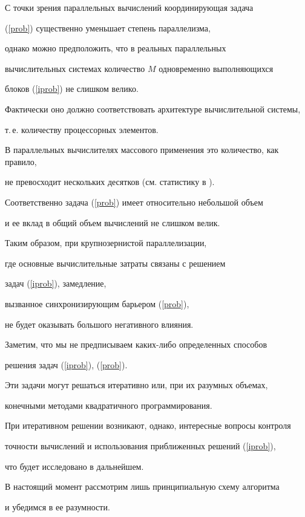С точки зрения параллельных вычислений координирующая задача


(\ref{prob}) существенно уменьшает степень параллелизма,


однако можно предположить, что в реальных параллельных


вычислительных системах количество $M$ одновременно выполняющихся


блоков (\ref{iprob}) не слишком велико.





Фактически оно должно соответствовать архитектуре вычислительной системы,


т.\,е. количеству процессорных элементов.


В параллельных вычислителях массового применения это количество, как правило,


не превосходит нескольких десятков (см. статистику в \cite{par}).


Соответственно  задача (\ref{prob}) имеет относительно небольшой объем


и ее вклад в общий объем вычислений не слишком велик.


Таким образом, при крупнозернистой параллелизации,


где основные вычислительные затраты связаны с решением


задач (\ref{iprob}), замедление,


вызванное синхронизирующим барьером (\ref{prob}),


не будет оказывать большого негативного влияния.





Заметим, что мы не предписываем каких-либо определенных способов


решения задач (\ref{iprob}), (\ref{prob}).


Эти задачи могут решаться итеративно или, при их разумных объемах,


конечными методами квадратичного программирования.


При итеративном решении возникают, однако, интересные вопросы контроля


точности вычислений и использования приближенных решений (\ref{iprob}),


что будет исследовано в дальнейшем.


В настоящий момент рассмотрим лишь принципиальную схему алгоритма


и убедимся в ее разумности.





